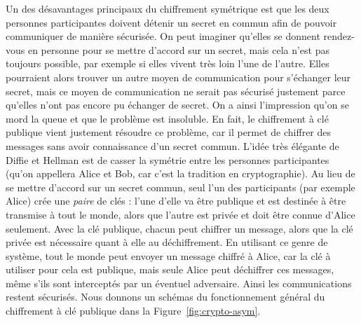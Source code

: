 Un des désavantages principaux du chiffrement symétrique est que les deux
personnes participantes doivent détenir un secret en commun afin de pouvoir
communiquer de manière sécurisée. On peut imaginer qu'elles se donnent
rendez-vous en personne pour se mettre d'accord sur un secret, mais cela n'est
pas toujours possible, par exemple si elles vivent très loin l'une de l'autre.
Elles pourraient alors trouver un autre moyen de communication pour s'échanger
leur secret, mais ce moyen de communication ne serait pas sécurisé justement
parce qu'elles n'ont pas encore pu échanger de secret. On a ainsi l'impression
qu'on se mord la queue et que le problème est insoluble. En fait, le chiffrement
à clé publique vient justement résoudre ce problème, car il permet de chiffrer
des messages sans avoir connaissance d'un secret commun. L'idée très élégante de
Diffie et Hellman est de casser la symétrie entre les personnes participantes
(qu'on appellera Alice et Bob, car c'est la tradition en cryptographie).
Au lieu de se mettre d'accord sur un secret commun, seul l'un des participants
(par exemple Alice) crée une \emph{paire} de clés : l'une d'elle va être
publique et est destinée à être transmise à tout le monde, alors que l'autre est
privée et doit être connue d'Alice seulement. Avec la clé publique, chacun peut
chiffrer un message, alors que la clé privée est nécessaire quant à elle au
déchiffrement. En utilisant ce genre de système, tout le monde peut envoyer un
message chiffré à Alice, car la clé à utiliser pour cela est publique, mais
seule Alice peut déchiffrer ces messages, même s'ils sont interceptés par un
éventuel adversaire. Ainsi les communications restent sécurisés. Nous donnons un
schémas du fonctionnement général du chiffrement à clé publique dans la
Figure~\ref{fig:crypto-asym}.
